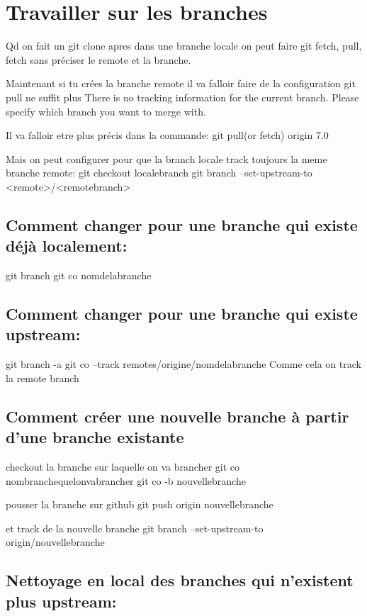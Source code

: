 \documentclass[12pt,a4paper]{article}
\begin{document}
\section{Travailler sur les branches}
\label{sec:branch}

Qd on fait un git clone apres dans une branche locale on peut faire git fetch, pull, fetch sans préciser le remote et la branche.

Maintenant si tu crées la branche remote il va falloir faire de la configuration
git pull ne suffit plus
There is no tracking information for the current branch.
Please specify which branch you want to merge with.

Il va falloir etre plus précis dans la commande:
git pull(or fetch) origin 7.0

Mais on peut configurer pour que la branch locale track toujours la meme branche remote:
git checkout localebranch
git branch --set-upstream-to <remote>/<remotebranch>

\subsection{Comment changer pour une branche qui existe déjà localement:}
\label{sec:changebranch}
git branch
git co nomdelabranche

\subsection{Comment changer pour une branche qui existe upstream:}
\label{sec:remotebranch}

git branch -a
git co --track remotes/origine/nomdelabranche
Comme cela on track la remote branch

\subsection{Comment créer une nouvelle branche à partir d'une branche existante}
\label{sec:createbranch}

checkout la branche sur laquelle on va brancher
git co nombranchequelonvabrancher
git co -b nouvellebranche

pousser la branche sur github
git push origin nouvellebranche

et track de la nouvelle branche
git branch --set-upstream-to origin/nouvellebranche

\subsection{Nettoyage en local des branches qui n'existent plus upstream:}
\label{sec:prune}
\end{document}

